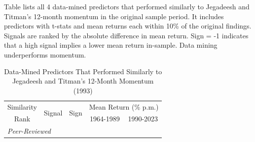\begin{table}[p]
\caption{Data-Mined Predictors That Performed Similarly to Jegadeesh and Titman's
12-Month Momentum (1993) }
\label{tab:closer_mom12m}

\begin{singlespace}
\noindent Table lists all 4 data-mined predictors that performed similarly to Jegadeesh and Titman's \citeyearpar{jegadeesh1993returns} 12-month momentum in the original sample period. It includes predictors with t-stats and mean returns each within 10\% of the original findings. Signals are ranked by the absolute difference in mean return. Sign = -1 indicates that a high signal implies a lower mean return in-sample. Data mining underperforms  momentum.
\end{singlespace}
\begin{centering}
\vspace{0ex}
\par\end{centering}
\centering{}\setlength{\tabcolsep}{0.5ex} \small
\begin{center}
\begin{tabular}{rlrrr} \toprule 
\multicolumn{1}{c}{Similarity} 
    & \multirow{2}[2]{*}{Signal} 
    & \multicolumn{1}{l}{\multirow{2}[2]{*}{Sign}} & \multicolumn{2}{c}{Mean Return (\% p.m.)} \\   
\multicolumn{1}{c}{Rank}  &  &   & \multicolumn{1}{c}{1964-1989} & \multicolumn{1}{c}{1990-2023} \\ 
\midrule 
\multicolumn{5}{l}{\textit{Peer-Reviewed}} \\ 
\midrule   

\bottomrule 
\end{tabular}%
\end{center} 
\end{table}



